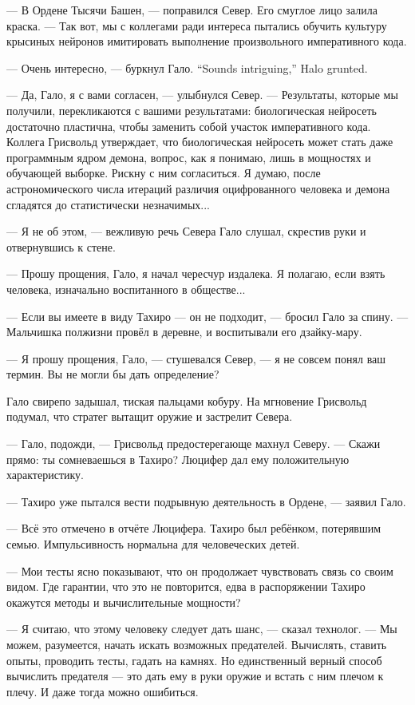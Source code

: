 --- В Ордене Тысячи Башен, --- поправился Север.
Его смуглое лицо залила краска.
--- Так вот, мы с коллегами ради интереса пытались обучить культуру крысиных нейронов имитировать выполнение произвольного императивного кода.

{--- Очень интересно, --- буркнул Гало.}
{``Sounds intriguing,'' Halo grunted.}

--- Да, Гало, я с вами согласен, --- улыбнулся Север.
--- Результаты, которые мы получили, перекликаются с вашими результатами: биологическая нейросеть достаточно пластична, чтобы заменить собой участок императивного кода.
Коллега Грисвольд утверждает, что биологическая нейросеть может стать даже программным ядром демона, вопрос, как я понимаю, лишь в мощностях и обучающей выборке.
Рискну с ним согласиться.
Я думаю, после астрономического числа итераций различия оцифрованного человека и демона сгладятся до статистически незначимых...

--- Я не об этом, --- вежливую речь Севера Гало слушал, скрестив руки и отвернувшись к стене.

--- Прошу прощения, Гало, я начал чересчур издалека.
Я полагаю, если взять человека, изначально воспитанного в обществе...

--- Если вы имеете в виду Тахиро --- он не подходит, --- бросил Гало за спину.
--- Мальчишка полжизни провёл в деревне, и воспитывали его дзайку-мару.

--- Я прошу прощения, Гало, --- стушевался Север, --- я не совсем понял ваш термин.
Вы не могли бы дать определение?

Гало свирепо задышал, тиская пальцами кобуру.
На мгновение Грисвольд подумал, что стратег вытащит оружие и застрелит Севера.

--- Гало, подожди, --- Грисвольд предостерегающе махнул Северу.
--- Скажи прямо: ты сомневаешься в Тахиро?
Люцифер дал ему положительную характеристику.

--- Тахиро уже пытался вести подрывную деятельность в Ордене, --- заявил Гало.

--- Всё это отмечено в отчёте Люцифера.
Тахиро был ребёнком, потерявшим семью.
Импульсивность нормальна для человеческих детей.

--- Мои тесты ясно показывают, что он продолжает чувствовать связь со своим видом.
Где гарантии, что это не повторится, едва в распоряжении Тахиро окажутся методы и вычислительные мощности?

--- Я считаю, что этому человеку следует дать шанс, --- сказал технолог.
--- Мы можем, разумеется, начать искать возможных предателей.
Вычислять, ставить опыты, проводить тесты, гадать на камнях.
Но единственный верный способ вычислить предателя --- это дать ему в руки оружие и встать с ним плечом к плечу.
И даже тогда можно ошибиться.

